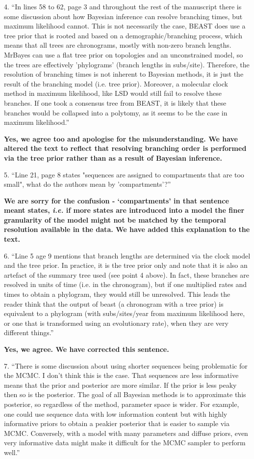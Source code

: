 \documentclass[11pt,oneside,letterpaper]{article}
\begin{document}
4. ``In lines 58 to 62, page 3 and throughout the rest of the manuscript there is some discussion about how Bayesian inference can resolve branching times, but maximum likelihood cannot. This is not necessarily the case, BEAST does use a tree prior that is rooted and based on a demographic/branching process, which means that all trees are chronograms, mostly with non-zero branch lengths. MrBayes can use a flat tree prior on topologies and an unconstrained model, so the trees are effectively 'phylograms' (branch lengths in subs/site). Therefore, the resolution of branching times is not inherent to Bayesian methods, it is just the result of the branching model (i.e. tree prior). Moreover, a molecular clock method in maximum likelihood, like LSD would still fail to resolve these branches. If one took a consensus tree from BEAST, it is likely that these branches would be collapsed into a polytomy, as it seems to be the case in maximum likelihood.''

\textbf{Yes, we agree too and apologise for the misunderstanding. We have altered the text to reflect that resolving branching order is performed via the tree prior rather than as a result of Bayesian inference.}

5. ``Line 21, page 8 states "sequences are assigned to compartments that are too small", what do the authors mean by 'compartments'?''

\textbf{We are sorry for the confusion - `compartments' in that sentence meant states, \textit{i.e.} if more states are introduced into a model the finer granularity of the model might not be matched by the temporal resolution available in the data. We have added this explanation to the text.}

6. ``Line 5 age 9 mentions that branch lengths are determined via the clock model and the tree prior. In practice, it is the tree prior only and note that it is also an artefact of the summary tree used (see point 4 above). In fact, these branches are resolved in units of time (i.e. in the chronogram), but if one multiplied rates and times to obtain a phylogram, they would still be unresolved. This leads the reader think that the output of beast (a chronogram with a tree prior) is equivalent to a phylogram (with subs/sites/year from maximum likelihood here, or one that is transformed using an evolutionary rate), when they are very different things.''

\textbf{Yes, we agree. We have corrected this sentence.}

7. ``There is some discussion about using shorter sequences being problematic for the MCMC. I don't think this is the case. That sequences are less informative means that the prior and posterior are more similar. If the prior is less peaky then so is the posterior. The goal of all Bayesian methods is to approximate this posterior, so regardless of the method, parameter space is wider. For example, one could use sequence data with low information content but with highly informative priors to obtain a peakier posterior that is easier to sample via MCMC. Conversely, with a model with many parameters and diffuse priors, even very informative data might make it difficult for the MCMC sampler to perform well.''
\end{document}
